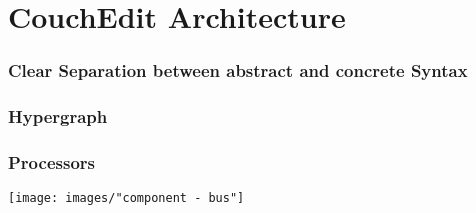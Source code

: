 \section{CouchEdit Architecture}

\begin{frame}
  \frametitle{Clear Separation between abstract and concrete Syntax}
\end{frame}


\begin{frame}
  \frametitle{Hypergraph}
\end{frame}

\begin{frame}
  \frametitle{Processors}
  \hspace{-1cm}
  \texttt{[image: images/"component - bus"]}
\end{frame}